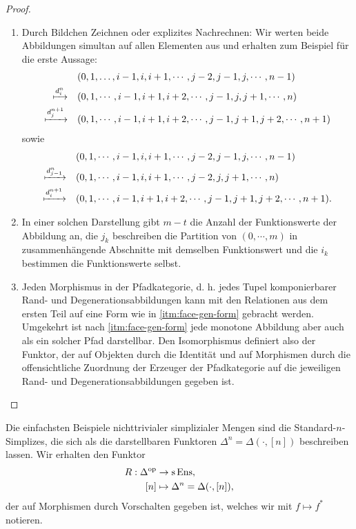 \begin{proof}
  \begin{enumerate}[label=(\roman*)]
  \item Durch Bildchen Zeichnen oder explizites Nachrechnen: Wir
  werten beide Abbildungen simultan auf allen Elementen aus und
  erhalten zum Beispiel für die erste Aussage:
  \begin{align*}
  &(0, 1, \dots, i-1, i, i+1, \cdots, j-2, j-1, j, \cdots, n-1) \\
  \xmapsto{d_i^n} \quad
  &(0, 1, \cdots, i-1, i+1, i+2, \cdots, j-1, j, j+1, \cdots, n) \\
  \xmapsto{d_j^{n+1}} \quad
  &(0, 1, \cdots, i-1, i+1, i+2, \cdots, j-1, j+1, j+2, \cdots, n+1)
  \end{align*}
  sowie
  \begin{align*}
  &(0, 1, \cdots, i-1, i, i+1, \cdots, j-2, j-1, j, \cdots, n-1) \\
  \xmapsto{d_{j-1}^n} \quad
  &(0, 1, \cdots, i-1, i, i+1, \cdots, j-2, j, j+1, \cdots, n) \\
  \xmapsto{d_i^{n+1}} \quad
  &(0, 1, \cdots, i-1, i+1, i+2, \cdots, j-1, j+1, j+2, \cdots, n+1).
  \end{align*}

  \item In einer solchen Darstellung gibt $m - t$ die Anzahl der
  Funktionswerte der Abbildung an, die $j_k$ beschreiben die Partition
  von $(0, \cdots, m)$ in zusammenhängende Abschnitte mit demselben
  Funktionswert und die $i_k$ bestimmen die Funktionswerte selbst.

  \item Jeden Morphismus in der Pfadkategorie, d. h. jedes Tupel
  komponierbarer Rand- und Degenerationsabbildungen kann mit den
  Relationen aus dem ersten Teil auf eine Form wie
  in \ref{itm:face-gen-form} gebracht werden. Umgekehrt ist
  nach \ref{itm:face-gen-form} jede monotone Abbildung aber auch als
  ein solcher Pfad darstellbar. Den Isomorphismus definiert also der
  Funktor, der auf Objekten durch die Identität und auf Morphismen
  durch die offensichtliche Zuordnung der Erzeuger der Pfadkategorie
  auf die jeweiligen Rand- und Degenerationsabbildungen gegeben ist.
\end{enumerate}
\end{proof}

Die einfachsten Beispiele nichttrivialer simplizialer Mengen sind die
Standard-$n$-Simplizes, die sich als die darstellbaren Funktoren
$\Delta^n = \Delta(\cdot, [n])$ beschreiben lassen. Wir erhalten den
Funktor
\begin{align*}
  R: \Delta^\mathrm{op} &\to \operatorname{s}\operatorname{Ens}, \\
  [n] &\mapsto \Delta^n = \Delta(\cdot, [n]),
\end{align*}
der auf Morphismen durch Vorschalten gegeben ist, welches wir mit
$f \mapsto f^*$ notieren.

